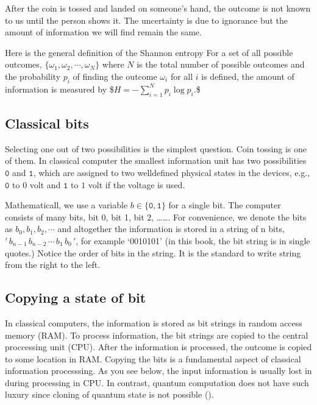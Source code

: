\documentclass[letterpaper,10pt,english]{jupyterBook}
\begin{document}
\sphinxAtStartPar
After the coin is tossed and landed on someone’s hand,  the outcome is not known to us until the person shows it.  The uncertainty is due to ignorance but the amount of information we will find remain the same.

\sphinxAtStartPar
Here is the general definition of the Shannon entropy
For a set of all possible outcomes, \(\{\omega_1, \omega_2, \cdots, \omega_N\}\) where \(N\) is the total number of possible outcomes and the probability \(p_i\) of finding the outcome \(\omega_i\) for all \(i\) is defined,  the amount of  information  is measured by
\$\(
H = - \sum_{i=1}^N p_i \log p_i.
\)\$


\subsection{Classical bits}
\label{\detokenize{computation/ccomp:classical-bits}}
\sphinxAtStartPar
Selecting one out of two possibilities is the simplest question.  Coin tossing is one of them. In classical computer the smallest  information unit has two possibilities \(\texttt{0}\) and \(\texttt{1}\), which are assigned to two well\sphinxhyphen{}defined physical states in the devices, e.g.,  \(\texttt{0}\) to \(0\) volt and \(\texttt{1}\) to \(1\) volt if the voltage is used.

\sphinxAtStartPar
Mathematicall, we use a variable \(b \in \{\texttt{0},\texttt{1}\}\) for a single bit.  The computer consists of many bits, bit 0, bit 1, bit 2, …….  For convenience, we denote the bits as \(b_0, b_1, b_2, \cdots \) and altogether the information is stored in a string of n bits, \('\, b_{n-1}\, b_{n-2}\, \cdots\, b_1\, b_0\, '\), for example ‘0010101’ (in this book, the bit string is in single quotes.)  Notice the order of bits in the string.  It is the standard to write string from the right to the left.


\subsection{Copying a state of bit}
\label{\detokenize{computation/ccomp:copying-a-state-of-bit}}
\sphinxAtStartPar
In classical computers, the information is stored as bit strings in random access memory (RAM).  To process information, the bit strings are copied to the central proccessing unit (CPU).  After the information is processed, the outcome is copied to some location in RAM.   Copying the bits is a fundamental aspect of classical information processsing. As you see below, the input information is usually lost in during processing in CPU.  In contrast, quantum computation does not have such luxury since cloning of quantum state is not possible ().
\end{document}
